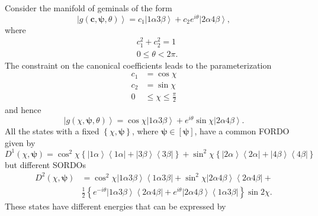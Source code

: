 \documentclass[aps,preprint]{revtex4}%
\begin{document}
Consider the manifold of geminals of the form
\begin{equation}
\left\vert g\left(  \boldsymbol{c},\boldsymbol{\psi},\theta\right)
\right\rangle =c_{1}\left\vert 1\alpha3\beta\right\rangle +c_{2}e^{i\theta
}\left\vert 2\alpha4\beta\right\rangle ,
\end{equation}
where
\begin{align}
&  c_{1}^{2}+c_{2}^{2}=1\nonumber\\
&  0\leq\theta<2\pi.
\end{align}
The constraint on the canonical coefficients leads to the parameterization
\begin{align}
c_{1}  &  =\cos\chi\nonumber\\
c_{2}  &  =\sin\chi\nonumber\\
0  &  \leq\chi\leq\frac{\pi}{2}%
\end{align}
and hence%
\begin{equation}
\left\vert g\left(  \chi,\boldsymbol{\psi},\theta\right)  \right\rangle
=\cos\chi\left\vert 1\alpha3\beta\right\rangle +e^{i\theta}\sin\chi\left\vert
2\alpha4\beta\right\rangle .
\end{equation}
All the states with a fixed $\left\{  \chi,\boldsymbol{\psi}\right\}  $, where
$\boldsymbol{\psi\in}\left[  \boldsymbol{\psi}\right]  $, have a common FORDO
given by%
\[
D^{1}\left(  \chi,\boldsymbol{\psi}\right)  =\cos^{2}\chi\left\{  \left\vert
1\alpha\right\rangle \left\langle 1\alpha\right\vert +\left\vert
3\beta\right\rangle \left\langle 3\beta\right\vert \right\}  +\sin^{2}%
\chi\left\{  \left\vert 2\alpha\right\rangle \left\langle 2\alpha\right\vert
+\left\vert 4\beta\right\rangle \left\langle 4\beta\right\vert \right\}
\]
but different SORDOs%
\begin{align}
D^{2}\left(  \chi,\boldsymbol{\psi}\right)   &  =\cos^{2}\chi\left\vert
1\alpha3\beta\right\rangle \left\langle 1\alpha3\beta\right\vert +\sin^{2}%
\chi\left\vert 2\alpha4\beta\right\rangle \left\langle 2\alpha4\beta
\right\vert +\nonumber\\
&  \frac{1}{2}\left\{  e^{-i\theta}\left\vert 1\alpha3\beta\right\rangle
\left\langle 2\alpha4\beta\right\vert +e^{i\theta}\left\vert 2\alpha
4\beta\right\rangle \left\langle 1\alpha3\beta\right\vert \right\}  \sin2\chi.
\end{align}
These states have different energies that can be expressed by%
\end{document}
